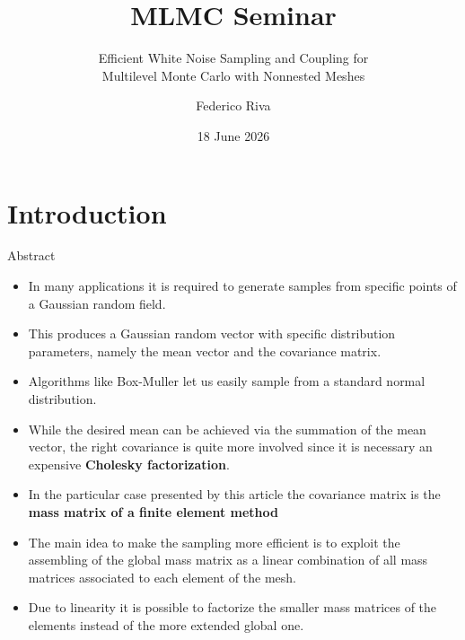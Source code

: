 \documentclass[
  english,            %
  aspectratio=169,    %
]{tumbeamer}
\title{MLMC Seminar}
\subtitle{Efficient White Noise Sampling and Coupling for\\ Multilevel Monte Carlo with Nonnested Meshes}
\author{Federico Riva}
\institute{Department of Mathematics\\\theUniversityName}
\date[18 June 2026]{18 June 2026}
\begin{document}
\maketitle

\section{Introduction}

\begin{frame}{Abstract}
\begin{itemize}
\item In many applications it is required to generate samples from specific points of a Gaussian
random field.
\bigskip
\item This produces a Gaussian random vector with specific distribution parameters, namely the mean vector and the covariance matrix.
\bigskip
\item Algorithms like Box-Muller let us easily sample from a standard normal distribution.
\bigskip
\item While the desired mean can be achieved via the summation of the mean vector, the right covariance is quite more involved since it is necessary an expensive \textbf{Cholesky factorization}.
\end{itemize}

\end{frame}

\begin{frame}{}
\bigskip
\begin{itemize}
\bigskip
\bigskip
\item  In the particular case presented by this article the covariance matrix is the \textbf{mass matrix of a finite element method}
\bigskip
\item The main idea to make the sampling more
efficient is to exploit the assembling of the global mass matrix as a linear combination of
all mass matrices associated to each element of the mesh.
\bigskip
\item Due to linearity it is possible to
factorize the smaller mass matrices of the elements instead of the more extended global one.
\end{itemize}

\end{frame}

\end{document}
